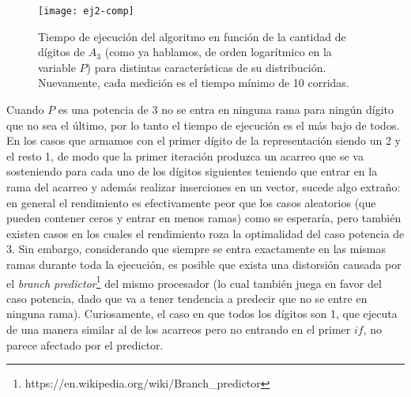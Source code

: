 	\begin{figure}[H]
	    \centering
	    \texttt{[image: ej2-comp]}
	    \caption{Tiempo de ejecución del algoritmo en función de la cantidad de dígitos de $A_3$ (como ya hablamos, de orden logarítmico en la variable $P$) para distintas características de su distribución. Nuevamente, cada medición es el tiempo mínimo de 10 corridas.}
	    \label{fig:ej2-comp}
	\end{figure}

	Cuando $P$ es una potencia de 3 no se entra en ninguna rama para ningún dígito que no sea el último, por lo tanto el tiempo de ejecución es el más bajo de todos. En los casos que armamos con el primer dígito de la representación siendo un 2 y el resto 1, de modo que la primer iteración produzca un acarreo que se va sosteniendo para cada uno de los dígitos siguientes teniendo que entrar en la rama del acarreo y además realizar inserciones en un vector, sucede algo extraño: en general el rendimiento es efectivamente peor que los casos aleatorios (que pueden contener ceros y entrar en menos ramas) como se esperaría, pero también existen casos en los cuales el rendimiento roza la optimalidad del caso potencia de 3. Sin embargo, considerando que siempre se entra exactamente en las mismas ramas durante toda la ejecución, es posible que exista una distorsión causada por el \emph{branch predictor}\footnote{https://en.wikipedia.org/wiki/Branch_predictor} del mismo procesador (lo cual también juega en favor del caso potencia, dado que va a tener tendencia a predecir que no se entre en ninguna rama). Curiosamente, el caso en que todos los dígitos son 1, que ejecuta de una manera similar al de los acarreos pero no entrando en el primer $if$, no parece afectado por el predictor.
